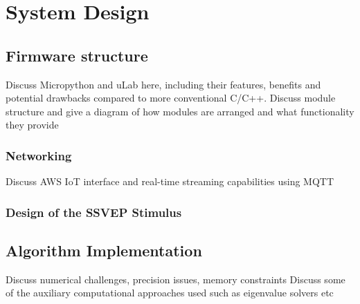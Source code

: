 \chapter{System Design}
\label{chapter:system-design}

\graphicspath{ {report/Chapter5/assets/} } 

\section{Firmware structure}
Discuss Micropython and uLab here, including their features, benefits and potential drawbacks compared to more conventional C/C++.
Discuss module structure and give a diagram of how modules are arranged and what functionality they provide

\subsection{Networking}
Discuss AWS IoT interface and real-time streaming capabilities using MQTT

\subsection{Design of the SSVEP Stimulus}

\section{Algorithm Implementation}
Discuss numerical challenges, precision issues, memory constraints
Discuss some of the auxiliary computational approaches used such as eigenvalue solvers etc

